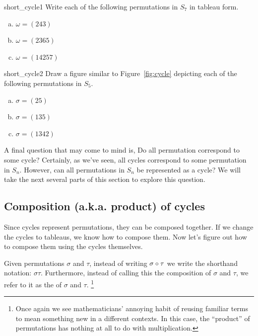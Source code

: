 \begin{exercise}{short_cycle1}
Write each of the following permutations in $S_7$ in tableau form.
\begin{enumerate}[(a)]
\item
$\omega = (243)$
\item
$\omega = (2365)$
\item
$\omega = (14257)$
\end{enumerate}
\end{exercise}

\begin{exercise}{short_cycle2}
Draw a figure similar to Figure~\ref{fig:cycle} depicting each of the following permutations in $S_5$.
\begin{enumerate}[(a)]
\item
$\sigma = (25)$
\item
$\sigma = (135)$
\item
$\sigma = (1342)$
\end{enumerate}
\end{exercise}
\noindent
A final question that may come to mind is,  Do all permutation correspond to some cycle?  Certainly, as we've seen, all cycles correspond to some permutation in $S_n$.  However, can all permutations in $S_n$ be represented as a cycle?  We will take the next several parts of this section to explore this question. 

\subsection{Composition (a.k.a. product) of cycles}

Since cycles represent permutations, they can be composed together.  If we change the cycles to tableaus, we know how to compose them.  Now let's figure out how to compose them using the cycles themselves.

\begin{notation}{}
Given permutations $\sigma$ and $\tau$, instead of writing $\sigma \circ \tau$ we write the shorthand notation: $\sigma \tau$. Furthermore, instead of calling this the composition of $\sigma$ and $\tau$, we refer to it as the  of $\sigma$ and $\tau$.
\footnote{Once again we see mathematicians'  annoying habit of  reusing familiar terms to mean something new  in a different contexts. In this case,  the ``product'' of permutations has nothing at all to do with multiplication.}
\end{notation}

